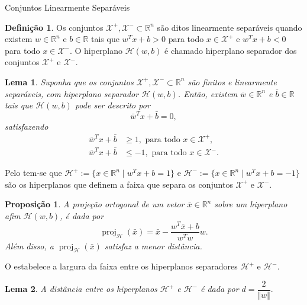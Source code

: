 \documentclass{beamer}
\DeclareMathOperator{\proj}{proj}
\def\Xset{\mathcal{X}}
\def\Hset{\mathcal{H}}
\def\RR{\mathds{R}}
\def\xbar{\bar{x}}
\def\wbar{\bar{w}}
\def\bbar{\bar{b}}
\newtheorem{prop}{Proposição}
\newtheorem{lema}{Lema}
\theoremstyle{definition}%
\newtheorem{defi}{Definição}
\begin{document}
\begin{frame}{Conjuntos Linearmente Separáveis}
\begin{defi} \label{def1} Os conjuntos $\Xset^{+}, \Xset^{-} \subset \RR^n$ são ditos linearmente separáveis quando existem $w\in \RR^n$ e $b\in \RR$  tais que $w^{T}x+b>0$ para todo $x\in \Xset^{+}$ e $w^{T}x+b<0$ para todo $x\in \Xset^{-}$. O hiperplano $\Hset(w,b)$ é chamado hiperplano separador dos conjuntos $\Xset^{+}$ e $\Xset^{-}$.
\end{defi}
\end{frame}


\begin{frame}
\begin{lema} \label{lema1} Suponha que os conjuntos $\Xset^{+}, \Xset^{-} \subset \RR^n$ são finitos e linearmente separáveis, com hiperplano separador $\Hset(w,b)$. Então, existem $\overline{w}\in \RR^n$ e $\overline{b}\in \RR$ tais que $\Hset(w,b)$ pode ser descrito por
	\[
	\wbar^{T}x+\bbar =0,
	\]
	satisfazendo
	\begin{align}
	\wbar^{T}x+\bbar &\geq 1, \text{ para todo } x\in \Xset^{+}, \label{eq1} \\
	\wbar^{T}x+\bbar &\leq -1, \text{ para todo } x\in \Xset^{-}. \label{eq2}
	\end{align}
\end{lema} 
\end{frame}


\begin{frame}
Pelo  tem-se que $\Hset^{+}:=\{x\in \RR^n \mid w^{T}x+b= 1\}$ e $\Hset^{-}:=\{x\in \RR^n \mid w^{T}x+b= -1\}$ são os hiperplanos que definem a faixa que separa os conjuntos $\Xset^{+}$ e $\Xset^{-}$.

\begin{prop} \label{prop1} A projeção ortogonal de um vetor $\xbar\in \RR^n$ sobre um hiperplano afim $\Hset(w,b)$, é dada por
	\[ \proj_{\Hset}(\xbar)= \xbar - \dfrac{w^{T}\xbar+b}{w^{T}w}w. \]
	Além disso, a $\proj_{\Hset}(\xbar)$ satisfaz a menor distância.
\end{prop}
\end{frame}


\begin{frame}
O  estabelece a largura da faixa entre os hiperplanos separadores $\Hset^{+}$ e $\Hset^{-}$.

\begin{lema}\label{lema2} A distância entre os hiperplanos $\Hset^{+}$ e $\Hset^{-}$ é dada por $d=\dfrac{2}{\Vert w\Vert}.$
\end{lema}
\end{frame}
\end{document}
